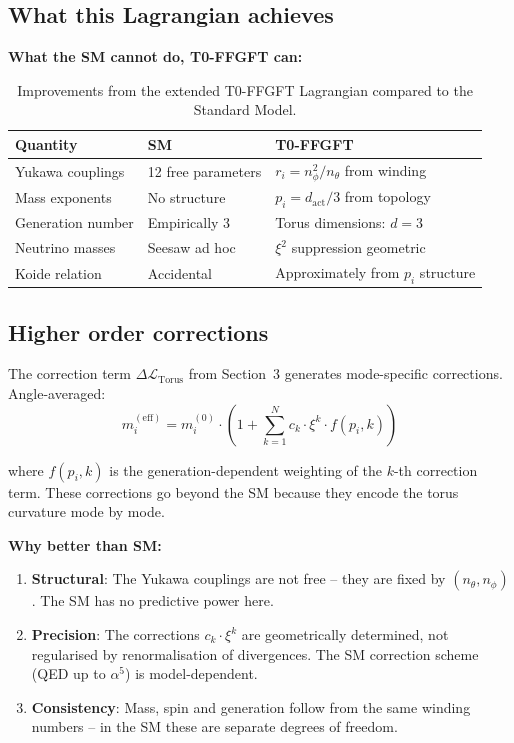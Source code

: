 \subsection{What this Lagrangian achieves}

\textbf{What the SM cannot do, T0-FFGFT can:}

\begin{table}[htbp]
\centering\footnotesize
\begin{tabular}{lll}
\toprule
\textbf{Quantity} & \textbf{SM} & \textbf{T0-FFGFT} \\
\midrule
Yukawa couplings  & 12 free parameters & $r_i = n_\phi^2/n_\theta$ from winding \\
Mass exponents    & No structure       & $p_i = d_{\text{act}}/3$ from topology \\
Generation number & Empirically 3      & Torus dimensions: $d=3$ \\
Neutrino masses   & Seesaw ad hoc      & $\xi^2$ suppression geometric \\
Koide relation    & Accidental         & Approximately from $p_i$ structure \\
\bottomrule
\end{tabular}
\caption{Improvements from the extended T0-FFGFT Lagrangian
compared to the Standard Model.}
\label{tab:improvements}
\end{table}

\subsection{Higher order corrections}

The correction term $\Delta\mathcal{L}_{\text{Torus}}$ from
Section~3 generates mode-specific corrections. Angle-averaged:
\begin{equation}
    m_i^{(\text{eff})} = m_i^{(0)} \cdot
    \left(1 + \sum_{k=1}^{N} c_k \cdot \xi^k \cdot f(p_i, k)\right)
\end{equation}

where $f(p_i, k)$ is the generation-dependent weighting of the
$k$-th correction term. These corrections go beyond the SM because
they encode the torus curvature mode by mode.

\textbf{Why better than SM:}
\begin{enumerate}
    \item \textbf{Structural}: The Yukawa couplings are not free
          -- they are fixed by $(n_\theta, n_\phi)$.
          The SM has no predictive power here.

    \item \textbf{Precision}: The corrections $c_k \cdot \xi^k$
          are geometrically determined, not regularised by
          renormalisation of divergences. The SM correction
          scheme (QED up to $\alpha^5$) is model-dependent.

    \item \textbf{Consistency}: Mass, spin and generation follow
          from the same winding numbers -- in the SM these are
          separate degrees of freedom.
\end{enumerate}

